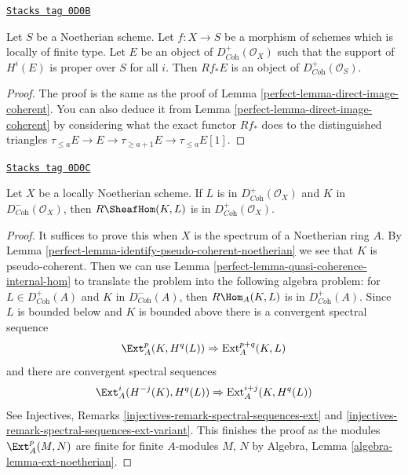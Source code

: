 \begin{lemma}
\label{perfect-lemma-direct-image-coherent-bdd-below}
\href{https://stacks.math.columbia.edu/tag/0D0B}{\texttt{Stacks tag 0D0B}}

Let $S$ be a Noetherian scheme. Let $f : X \to S$ be a morphism of schemes
which is locally of finite type. Let $E$ be an object of
$D^+_{\textit{Coh}}(\mathcal{O}_X)$ such that the support of $H^i(E)$
is proper over $S$ for all $i$.
Then $Rf_*E$ is an object of $D^+_{\textit{Coh}}(\mathcal{O}_S)$.
\end{lemma}

\begin{proof}

The proof is the same as the proof of
Lemma \ref{perfect-lemma-direct-image-coherent}.
You can also deduce it from
Lemma \ref{perfect-lemma-direct-image-coherent}
by considering what the exact functor $Rf_*$ does to
the distinguished triangles
$\tau_{\leq a}E \to E \to \tau_{\geq a + 1}E \to \tau_{\leq a}E[1]$.
\end{proof}

\begin{lemma}
\label{perfect-lemma-coherent-internal-hom}
\href{https://stacks.math.columbia.edu/tag/0D0C}{\texttt{Stacks tag 0D0C}}

Let $X$ be a locally Noetherian scheme. If $L$ is in
$D^+_{\textit{Coh}}(\mathcal{O}_X)$ and $K$ in
$D^-_{\textit{Coh}}(\mathcal{O}_X)$, then
$R\SheafHom(K, L)$ is in $D^+_{\textit{Coh}}(\mathcal{O}_X)$.
\end{lemma}

\begin{proof}

It suffices to prove this when $X$ is the spectrum of
a Noetherian ring $A$.
By Lemma \ref{perfect-lemma-identify-pseudo-coherent-noetherian}
we see that $K$ is pseudo-coherent.
Then we can use Lemma \ref{perfect-lemma-quasi-coherence-internal-hom}
to translate the problem into the following algebra problem:
for $L \in D^+_{\textit{Coh}}(A)$ and $K$ in $D^-_{\textit{Coh}}(A)$, then
$R\Hom_A(K, L)$ is in $D^+_{\textit{Coh}}(A)$.
Since $L$ is bounded below and $K$ is bounded above there is a
convergent spectral sequence
$$
\Ext^p_A(K, H^q(L)) \Rightarrow \text{Ext}^{p + q}_A(K, L)
$$
and there are convergent spectral sequences
$$
\Ext^i_A(H^{-j}(K), H^q(L)) \Rightarrow \text{Ext}^{i + j}_A(K, H^q(L))
$$
See Injectives, Remarks \ref{injectives-remark-spectral-sequences-ext}
and \ref{injectives-remark-spectral-sequences-ext-variant}.
This finishes the proof as the modules $\Ext^p_A(M, N)$
are finite for finite $A$-modules $M$, $N$ by
Algebra, Lemma \ref{algebra-lemma-ext-noetherian}.
\end{proof}

